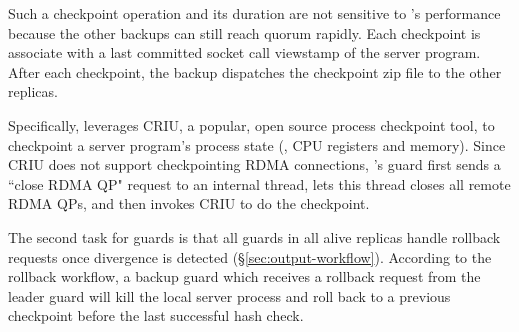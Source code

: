 Such a checkpoint operation and its duration are not sensitive to \xxx's 
performance because the other backups can still reach quorum rapidly. Each 
checkpoint is associate with a last committed socket call viewstamp of the 
server program. After each checkpoint, the backup dispatches the checkpoint zip 
file to the other replicas.

Specifically, \xxx leverages CRIU, a popular, open source process checkpoint 
tool, to checkpoint a server program's process state (\eg, CPU registers and 
memory). Since CRIU does not support checkpointing RDMA connections, \xxx's 
guard first sends a ``close RDMA QP" request to an \xxx internal thread, lets 
this thread closes all remote RDMA QPs, and then invokes CRIU to do the 
checkpoint.

The second task for guards is that all guards in all alive replicas handle 
rollback requests once divergence is detected (\S\ref{sec:output-workflow}). 
According to the rollback workflow, a backup guard which receives a rollback 
request from the leader guard will kill the local server process and roll back 
to a previous checkpoint before the last successful hash check.










% 


